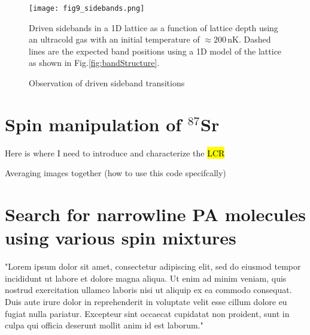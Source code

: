 \begin{figure} \label{fig:oneColorSB}
	\texttt{[image: fig9\_sidebands.png]}
	\caption{Observation of driven sideband transitions}{Driven sidebands in a 1D lattice as a function of lattice depth using an ultracold gas with an initial temperature of $\approx 200\,$nK. Dashed lines are the expected band positions using a 1D model of the lattice as shown in Fig.\;\ref{fig:bandStructure}.}
\end{figure} 
	

\section{Spin manipulation of $^{87}$Sr}
\label{sec:spin_pol}

Here is where I need to introduce and characterize the \hl{LCR}

Averaging images together (how to use this code specifcally)

\section{Search for narrowline PA molecules using various spin mixtures}
\label{sec:87PAS}

"Lorem ipsum dolor sit amet, consectetur adipiscing elit, sed do eiusmod tempor incididunt ut labore et dolore magna aliqua. Ut enim ad minim veniam, quis nostrud exercitation ullamco laboris nisi ut aliquip ex ea commodo consequat. Duis aute irure dolor in reprehenderit in voluptate velit esse cillum dolore eu fugiat nulla pariatur. Excepteur sint occaecat cupidatat non proident, sunt in culpa qui officia deserunt mollit anim id est laborum."